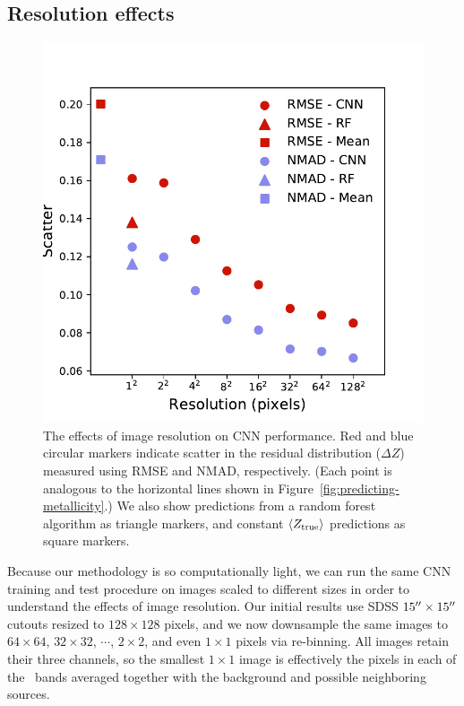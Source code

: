 \documentclass[fleqn,usenatbib]{mnras}
\begin{document}
\subsection{Resolution effects} \label{sec:resolution}

\begin{figure}
	\includegraphics[width=\columnwidth]{04-resolution.pdf}
	\caption{\label{fig:resolution}
		The effects of image resolution on CNN performance. Red and blue circular markers indicate scatter in the residual distribution ($\Delta Z$) measured using RMSE and NMAD, respectively. (Each point is analogous to the horizontal lines shown in Figure~\ref{fig:predicting-metallicity}.) We also show predictions from a random forest algorithm as triangle markers, and constant $\langle Z_{\rm true}\rangle$ predictions as square markers.}
\end{figure}

Because our methodology is so computationally light, we can run the same CNN training and test procedure on images scaled to different sizes in order to understand the effects of image resolution. Our initial results use SDSS $15\hbox{$^{\prime\prime}$} \times 15 \hbox{$^{\prime\prime}$}$ cutouts resized to $128\times 128$ pixels, and we now downsample the same images to $64\times 64$, $32 \times 32$, $\cdots$, $2\times 2$, and even $1\times 1$ pixels via re-binning. All images retain their three channels, so the smallest $1 \times 1$ image is effectively the pixels in each of the \sdssg\sdssr\sdssi\ bands averaged together with the background and possible neighboring sources.
\end{document}
